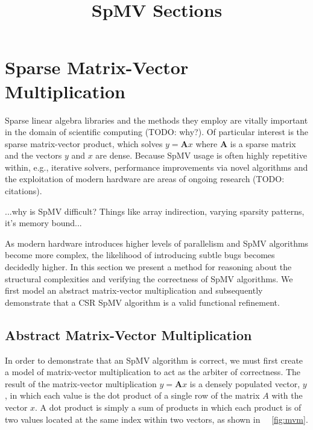 \documentclass[sigconf]{acmart}
\begin{document}
\pagestyle{plain}
\title{SpMV Sections}
\maketitle

\section{Sparse Matrix-Vector Multiplication}

Sparse linear algebra libraries and the methods they employ are vitally important in the domain of scientific computing (TODO: why?).  Of particular interest is the sparse matrix-vector product, which solves $y = \bm{A}x$ where $\bm{A}$ is a sparse matrix and the vectors $y$ and $x$ are dense.  Because SpMV usage is often highly repetitive within, e.g., iterative solvers, performance improvements via novel algorithms and the exploitation of modern hardware are areas of ongoing research (TODO: citations).

...why is SpMV difficult? Things like array indirection, varying sparsity patterns, it's memory bound...

As modern hardware introduces higher levels of parallelism and SpMV algorithms become more complex, the likelihood of introducing subtle bugs becomes decidedly higher.  In this section we present a method for reasoning about the structural complexities and verifying the correctness of SpMV algorithms.  We first model an abstract matrix-vector multiplication and subsequently demonstrate that a CSR SpMV algorithm is a valid functional refinement.

\subsection{Abstract Matrix-Vector Multiplication}

In order to demonstrate that an SpMV algorithm is correct, we must first create a model of matrix-vector multiplication to act as the arbiter of correctness.  The result of the matrix-vector multiplication $y = \bm{A}x$ is a densely populated vector, $y$, in which each value is the dot product of a single row of the matrix $A$ with the vector $x$.  A dot product is simply a sum of products in which each product is of two values located at the same index within two vectors, as shown in ~\figurename~\ref{fig:mvm}.
\end{document}
